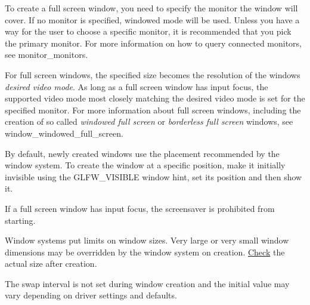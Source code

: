 To create a full screen window, you need to specify the monitor the window will cover. If no monitor is specified, windowed mode will be used. Unless you have a way for the user to choose a specific monitor, it is recommended that you pick the primary monitor. For more information on how to query connected monitors, see monitor\+\_\+monitors.

For full screen windows, the specified size becomes the resolution of the window\textquotesingle{}s {\itshape desired video mode}. As long as a full screen window has input focus, the supported video mode most closely matching the desired video mode is set for the specified monitor. For more information about full screen windows, including the creation of so called {\itshape windowed full screen} or {\itshape borderless full screen} windows, see window\+\_\+windowed\+\_\+full\+\_\+screen.

By default, newly created windows use the placement recommended by the window system. To create the window at a specific position, make it initially invisible using the G\+L\+F\+W\+\_\+\+V\+I\+S\+I\+B\+L\+E window hint, set its position and then show it.

If a full screen window has input focus, the screensaver is prohibited from starting.

Window systems put limits on window sizes. Very large or very small window dimensions may be overridden by the window system on creation. \hyperlink{structCheck}{Check} the actual size after creation.

The swap interval is not set during window creation and the initial value may vary depending on driver settings and defaults.


